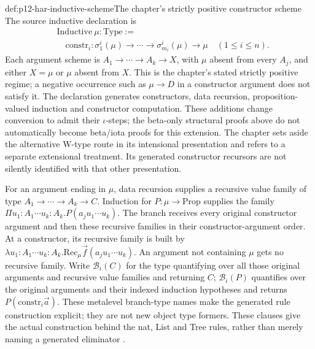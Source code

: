 \begin{hbdefinition}{def:p12-har-inductive-scheme}{The chapter's strictly positive constructor scheme}
The source inductive declaration is
\[
\begin{aligned}
 &\mathrm{Inductive}\ \mu:\mathrm{Type}:=\\
 &\quad\mathrm{constr}_i:
    \sigma_1^i(\mu)\to\cdots\to\sigma_{m_i}^i(\mu)\to\mu
          \quad(1\le i\le n).
\end{aligned}
\]
Each argument scheme is \(A_1\to\cdots\to A_k\to X\),
with \(\mu\) absent from every \(A_j\), and either
\(X=\mu\) or \(\mu\) absent from \(X\). This is the
chapter's stated strictly positive regime; a negative occurrence such as
\(\mu\to D\) in a constructor argument does not satisfy it.
The declaration generates constructors, data recursion, proposition-valued
induction and constructor computation. These additions change conversion
to admit their \(\iota\)-steps; the beta-only structural proofs above
do not automatically become beta/iota proofs for this extension.
The chapter sets aside the alternative W-type route in its intensional
presentation and refers to a separate extensional treatment. Its
generated constructor recursors are not silently identified with that
other presentation.

For an argument ending in \(\mu\), data recursion supplies a recursive
value family of type \(A_1\to\cdots\to A_k\to C\).
Induction for \(P:\mu\to\mathrm{Prop}\) supplies the family
\(\Pi u_1:A_1\cdots u_k:A_k.P(a_j u_1\cdots u_k)\).
The branch receives every original constructor argument and then these
recursive families in their constructor-argument order. At a constructor,
its recursive family is built by
\(\lambda u_1:A_1\cdots u_k:A_k.
\mathrm{Rec}_\mu\vec f(a_j u_1\cdots u_k)\).
An argument not containing \(\mu\) gets no recursive family. Write
\(\mathcal B_i(C)\) for the type quantifying over all those original
arguments and recursive value families and returning \(C\);
\(\mathcal B_i(P)\) quantifies over the original arguments and
their indexed induction hypotheses and returns
\(P(\mathrm{constr}_i\vec a)\). These metalevel branch-type names
make the generated rule construction explicit; they are not new object
type formers. These
clauses give the actual construction behind the nat, List and Tree rules,
rather than merely naming a generated eliminator
\cite[pp.~1206--1209]{BarendregtGeuvers2001}.
\end{hbdefinition}

